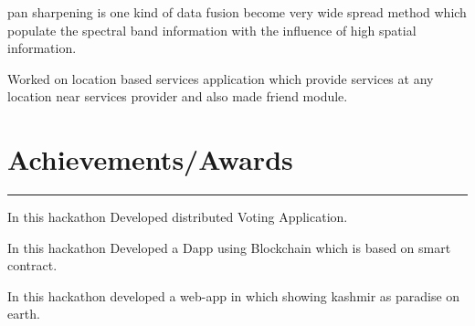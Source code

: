 \documentclass[]{rahulworld-resume}
\begin{document}
\begin{minipage}[t]{0.66\textwidth}
 
\noindent
\hspace{5em}%
\begin{minipage}{0.85\textwidth\vspace{2pt}}
pan sharpening is one kind of data fusion become very wide spread method which populate the spectral band information with the influence of high spatial information.
\end{minipage}
\sectionsep

 
\noindent
\hspace{5em}%
\begin{minipage}{0.85\textwidth\vspace{2pt}}
Worked on location based services application which provide services at any location near
services provider and also made friend module.
\end{minipage}
\section{Achievements/Awards} 
\noindent\rule{12.5cm}{0.4pt}
 
\noindent
\hspace{5em}%
\begin{minipage}{0.85\textwidth\vspace{2pt}}
In this hackathon Developed distributed Voting Application.
\end{minipage}
 
\noindent
\hspace{5em}%
\begin{minipage}{0.85\textwidth\vspace{2pt}}
In this hackathon Developed a Dapp using Blockchain which is based on smart contract.
\end{minipage}
 
\noindent
\hspace{5em}%
\begin{minipage}{0.85\textwidth\vspace{2pt}}
In this hackathon developed a web-app in which showing kashmir as paradise on earth.
\end{minipage}

\end{minipage}
\end{document}
